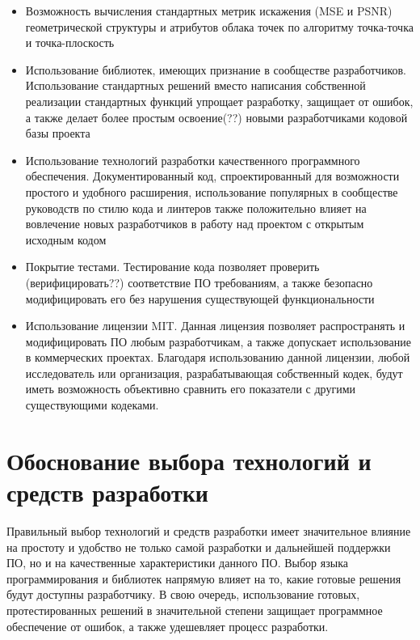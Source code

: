 \begin{itemize}
    \item Возможность вычисления стандартных метрик искажения (MSE и PSNR)
    геометрической структуры и атрибутов облака точек по алгоритму точка-точка и
    точка-плоскость
    \item Использование библиотек, имеющих признание в сообществе разработчиков.
    Использование стандартных решений вместо написания собственной реализации
    стандартных функций упрощает разработку, защищает от ошибок, а также делает
    более простым освоение(??) новыми разработчиками кодовой базы проекта
    \item Использование технологий разработки качественного программного
    обеспечения. Документированный код, спроектированный для возможности
    простого и удобного расширения, использование популярных в сообществе
    руководств по стилю кода и линтеров также положительно влияет на вовлечение
    новых разработчиков в работу над проектом с открытым исходным кодом
    \item Покрытие тестами. Тестирование кода позволяет проверить
    (верифицировать??) соответствие ПО требованиям, а также безопасно
    модифицировать его без нарушения существующей функциональности
    \item Использование лицензии MIT. Данная лицензия позволяет распространять и
    модифицировать ПО любым разработчикам, а также допускает использование в
    коммерческих проектах. Благодаря использованию данной лицензии, любой
    исследователь или организация, разрабатывающая собственный кодек, будут
    иметь возможность объективно сравнить его показатели с другими существующими
    кодеками.
\end{itemize}

\newpage
\chapter{Обоснование выбора технологий и средств разработки}

Правильный выбор технологий и средств разработки имеет значительное влияние на
простоту и удобство не только самой разработки и дальнейшей поддержки ПО, но и
на качественные характеристики данного ПО. Выбор языка программирования и
библиотек напрямую влияет на то, какие готовые решения будут доступны
разработчику. В свою очередь, использование готовых, протестированных решений в
значительной степени защищает программное обеспечение от ошибок, а также
удешевляет процесс разработки.

